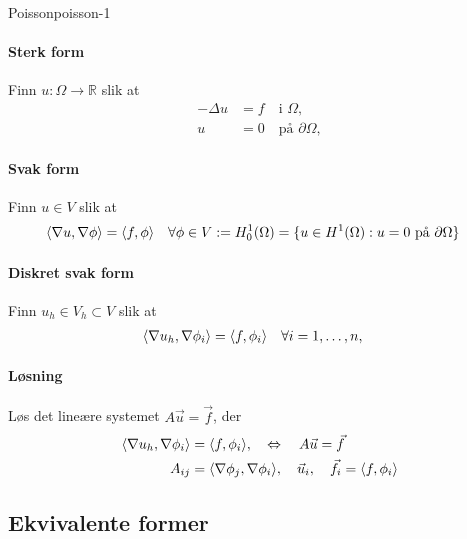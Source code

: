 \begin{example}{Poisson}{poisson-1}
    \paragraph{Sterk form}
    Finn $u: \Omega \to \mathbb{R}$ slik at
    \begin{align*}
        -\Delta u & = f \quad \text{i } \Omega,          \\
        u         & = 0 \quad \text{på } \partial\Omega,
    \end{align*}

    \paragraph{Svak form}
    Finn $u \in V$ slik at
    \begin{align*}
        \inner*{\nabla u, \nabla \phi} & = \inner*{f, \phi} \quad \forall \phi \in V := H^1_0(\Omega) = \{ u \in H^1(\Omega) : u = 0 \text{ på } \partial\Omega \}
    \end{align*}

    \paragraph{Diskret svak form}
    Finn $u_h \in V_h \subset V$ slik at
    \begin{align*}
        \inner*{\nabla u_h, \nabla \phi_i} & = \inner*{f, \phi_i} \quad \forall i = 1, \ldots, n,
    \end{align*}

    \paragraph{Løsning}
    Løs det lineære systemet $A\vec{u} = \vec{f}$, der
    \begin{align*}
        \inner*{\nabla u_h, \nabla \phi_i} & = \inner*{f, \phi_i},  \quad \Leftrightarrow \quad A\vec{u} = \vec{f}                          \\
        A_{ij}                             & = \inner*{\nabla \phi_j, \nabla \phi_i}, \quad \vec{u}_i, \quad \vec{f}_i = \inner*{f, \phi_i} \\
    \end{align*}

\end{example}

\subsection{Ekvivalente former}
